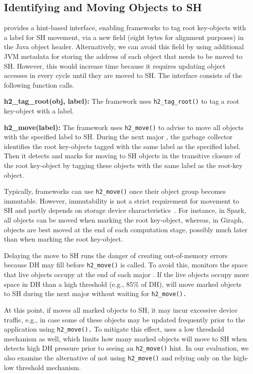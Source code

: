 \subsection{Identifying and Moving Objects to SH}
\label{sec:api}

\teraheapName{} provides a hint-based interface, enabling frameworks to tag
root key-objects with a label for SH movement, via a new field (eight
bytes for alignment purposes) in the Java object header.
Alternatively, we can avoid this field by using additional JVM
metadata for storing the address of each object that needs to be moved
to SH. However, this would increase \teraheapGC time because it requires
updating object accesses in every \teraheapGC cycle until they are moved to
SH. The \teraheapName{} interface consists of the following function calls.

\textbf{h2\_tag\_root(obj, label):}
The framework uses \texttt{h2\_tag\_root()} to tag a root key-object
with a label.

\textbf{h2\_move(label):}
The framework uses \texttt{h2\_move()} to advise \teraheapName{} to move all
objects with the specified label to SH. During the next major \teraheapGC, the
garbage collector identifies the root key-objects tagged with the same
label as the specified label. Then it detects and marks for moving to
SH objects in the transitive closure of the root key-object by tagging
these objects with the same label as the root-key object.

Typically, frameworks can use \texttt{h2\_move()} once their object
group becomes immutable. However, immutability is not a strict
requirement for movement to SH and partly depends on storage device
characteristics~\cite{swanson:nvm}. For instance, in Spark, all
objects can be moved when marking the root key-object, whereas, in
Giraph, objects are best moved at the end of each computation stage,
possibly much later than when marking the root key-object.

Delaying the move to SH runs the danger of creating out-of-memory
errors because DH may fill before \texttt{h2\_move()} is called.  To
avoid this, \teraheapName{} monitors the space that live objects occupy at the
end of each major \teraheapGC. If the live objects occupy more space in DH
than a high threshold (e.g., 85\% of DH), \teraheapName{} will move marked
objects to SH during the next major \teraheapGC without waiting for
\texttt{h2\_move().}

At this point, if \teraheapName{} moves all marked objects to SH, it may incur
excessive device traffic, e.g., in case some of these objects may be
updated frequently prior to the application using \texttt{h2\_move().}
To mitigate this effect, \teraheapName{} uses a low threshold mechanism as
well, which limits how many marked objects will move to SH when
\teraheapName{} detects high DH pressure prior to seeing an
\texttt{h2\_move()} hint. In our evaluation, we also examine the
alternative of not using \texttt{h2\_move()} and relying only on the
high-low threshold mechanism.

